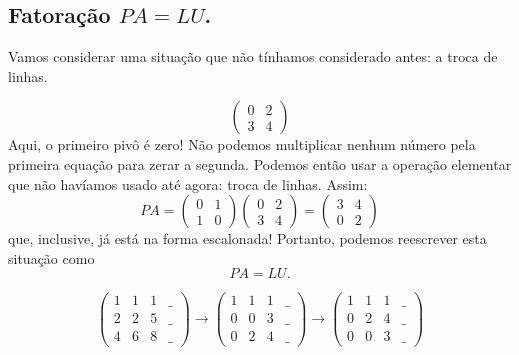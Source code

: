 \subsection{Fatoração $PA=LU$.}

Vamos considerar uma situação que não tínhamos considerado antes: a troca de linhas.

\begin{exemplo*}
	\begin{equation*}
	   \begin{pmatrix}
	      0 & 2\\
	      3 & 4
	   \end{pmatrix}
	\end{equation*}
	Aqui, o primeiro pivô é zero! Não podemos multiplicar nenhum número pela primeira equação para zerar a segunda. Podemos então usar a operação elementar que não havíamos usado até agora: troca de linhas. Assim:
	\begin{equation*}
	   PA = \begin{pmatrix} 0 & 1\\1& 0 \end{pmatrix} \begin{pmatrix} 0 & 2\\3 &
4 \end{pmatrix} = \begin{pmatrix} 3 & 4\\ 0 & 2\end{pmatrix}
	\end{equation*}
	que, inclusive, já está na forma escalonada! Portanto, podemos reescrever esta situação como
	\begin{equation*} 
		PA = LU.
	\end{equation*}
\end{exemplo*}

\begin{exemplo*}
	\begin{equation*}
   \begin{pmatrix}
      1 & 1 & 1 & \_ \\
      2 & 2 & 5 & \_ \\
      4 & 6 & 8 & \_
   \end{pmatrix}
   \rightarrow 
   \begin{pmatrix}
      1 & 1 & 1 & \_ \\
      0 & 0 & 3 & \_ \\
      0 & 2 & 4 & \_
   \end{pmatrix}
   \rightarrow 
   \begin{pmatrix}
      1 & 1 & 1 & \_ \\
      0 & 2 & 4 & \_ \\
      0 & 0 & 3 & \_ 
   \end{pmatrix}
	\end{equation*}
\end{exemplo*}

